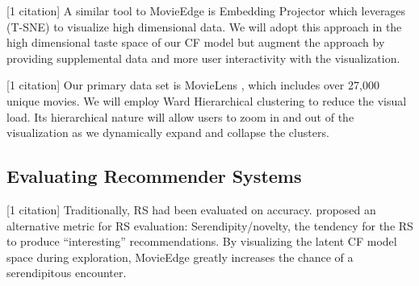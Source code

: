 [1 citation] A similar tool to MovieEdge is Embedding Projector \cite{smilkov2016embedding} which leverages \mbox{(T-SNE)} to visualize high dimensional data. We will adopt this approach in the high dimensional taste space of our CF model but augment the approach by providing supplemental data and more user interactivity with the visualization. 

[1 citation] Our primary data set is MovieLens \cite{harper2016movielens}, which includes over 27,000 unique movies. We will employ Ward Hierarchical clustering \cite{ward1963hierarchical} to reduce the visual load. Its hierarchical nature will allow users to zoom in and out of the visualization as we dynamically expand and collapse the clusters.

\subsection{Evaluating Recommender Systems}

[1 citation] Traditionally, RS had been evaluated on accuracy. \cite{herlocker2004evaluating} proposed an alternative metric for RS evaluation: Serendipity/novelty, the tendency for the RS to produce  “interesting” recommendations. By visualizing the latent CF model space during exploration, MovieEdge greatly increases the chance of a serendipitous encounter.


